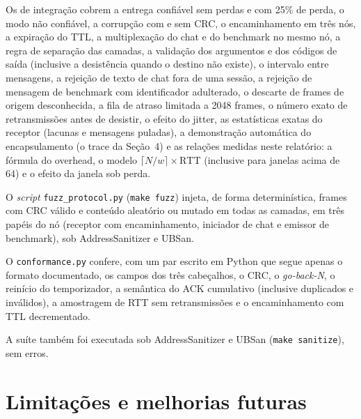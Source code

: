\documentclass[11pt,a4paper]{article}
\begin{document}
Os de integra\c{c}\~ao cobrem a entrega confi\'avel sem perdas e com 25\% de perda, o modo n\~ao confi\'avel, a corrup\c{c}\~ao com e sem CRC, o encaminhamento em tr\^es n\'os, a expira\c{c}\~ao do TTL, a multiplexa\c{c}\~ao do chat e do benchmark no mesmo n\'o, a regra de separa\c{c}\~ao das camadas, a valida\c{c}\~ao dos argumentos e dos c\'odigos de sa\'ida (inclusive a desist\^encia quando o destino n\~ao existe), o intervalo entre mensagens, a rejei\c{c}\~ao de texto de chat fora de uma sess\~ao, a rejei\c{c}\~ao de mensagem de benchmark com identificador adulterado, o descarte de frames de origem desconhecida, a fila de atraso limitada a 2048 frames, o n\'umero exato de retransmiss\~oes antes de desistir, o efeito do jitter, as estat\'isticas exatas do receptor (lacunas e mensagens puladas), a demonstra\c{c}\~ao autom\'atica do encapsulamento (o trace da Se\c{c}\~ao~4) e as rela\c{c}\~oes medidas neste relat\'orio: a f\'ormula do overhead, o modelo $\lceil N/w \rceil \times \text{RTT}$ (inclusive para janelas acima de 64) e o efeito da janela sob perda.

O \emph{script} \texttt{fuzz\_protocol.py} (\texttt{make fuzz}) injeta, de forma determin\'istica, frames com CRC v\'alido e conte\'udo aleat\'orio ou mutado em todas as camadas, em tr\^es pap\'eis do n\'o (receptor com encaminhamento, iniciador de chat e emissor de benchmark), sob AddressSanitizer e UBSan.

O \texttt{conformance.py} confere, com um par escrito em Python que segue apenas o formato documentado, os campos dos tr\^es cabe\c{c}alhos, o CRC, o \emph{go-back-N}, o rein\'icio do temporizador, a sem\^antica do ACK cumulativo (inclusive duplicados e inv\'alidos), a amostragem de RTT sem retransmiss\~oes e o encaminhamento com TTL decrementado.

A su\'ite tamb\'em foi executada sob AddressSanitizer e UBSan (\texttt{make sanitize}), sem erros.

\section{Limita\c{c}\~oes e melhorias futuras}
\end{document}
